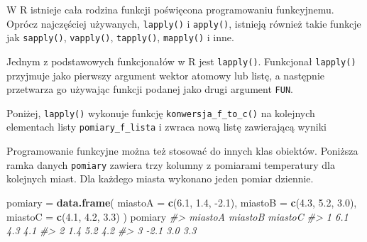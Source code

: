 \documentclass[paper=6in:9in,pagesize=pdftex,headinclude=on,footinclude=on,10pt]{scrbook}
\makeatletter
\newenvironment{Shaded}{\begin{snugshade}}{\end{snugshade}}
\newcommand{\CommentTok}[1]{\textcolor[rgb]{0.56,0.35,0.01}{\textit{#1}}}
\newcommand{\DataTypeTok}[1]{\textcolor[rgb]{0.13,0.29,0.53}{#1}}
\newcommand{\FloatTok}[1]{\textcolor[rgb]{0.00,0.00,0.81}{#1}}
\newcommand{\KeywordTok}[1]{\textcolor[rgb]{0.13,0.29,0.53}{\textbf{#1}}}
\newcommand{\NormalTok}[1]{#1}
\newcommand{\StringTok}[1]{\textcolor[rgb]{0.31,0.60,0.02}{#1}}
\newenvironment{kframe}{%
\medskip{}
\setlength{\fboxsep}{.8em}
 \def\at@end@of@kframe{}%
 \ifinner\ifhmode%
  \def\at@end@of@kframe{\end{minipage}}%
  \begin{minipage}{\columnwidth}%
 \fi\fi%
 \def\FrameCommand##1{\hskip\@totalleftmargin \hskip-\fboxsep
 \colorbox{shadecolor}{##1}\hskip-\fboxsep
     \hskip-\linewidth \hskip-\@totalleftmargin \hskip\columnwidth}%
 \MakeFramed {\advance\hsize-\width
   \@totalleftmargin\z@ \linewidth\hsize
   \@setminipage}}%
 {\par\unskip\endMakeFramed%
 \at@end@of@kframe}
\newenvironment{rmdblock}[1]
  {
  \begin{itemize}
  \renewcommand{\labelitemi}{
    \raisebox{-.7\height}[0pt][0pt]{
      {\setkeys{Gin}{width=3em,keepaspectratio}\texttt{[image: images/\#1]}}
    }
  }
  \setlength{\fboxsep}{1em}
  \begin{kframe}
  \item
  }
  {
  \end{kframe}
  \end{itemize}
  }
\newenvironment{rmdinfo}
  {\begin{rmdblock}{compass}}
  {\end{rmdblock}}
\makeatother
\begin{document}
\begin{rmdinfo}
W R istnieje cała rodzina funkcji poświęcona programowaniu funkcyjnemu.
Oprócz najczęściej używanych, \texttt{lapply()} i \texttt{apply()}, istnieją również takie funkcje jak \texttt{sapply()}, \texttt{vapply()}, \texttt{tapply()}, \texttt{mapply()} i inne.
\end{rmdinfo}

Jednym z podstawowych funkcjonałów w R jest \texttt{lapply()}.
Funkcjonał \texttt{lapply()} przyjmuje jako pierwszy argument wektor atomowy lub listę, a następnie przetwarza go używając funkcji podanej jako drugi argument \texttt{FUN}.

Poniżej, \texttt{lapply()} wykonuje funkcję \texttt{konwersja\_f\_to\_c()} na kolejnych elementach listy \texttt{pomiary\_f\_lista} i zwraca nową listę zawierającą wyniki

\begin{Shaded}
\end{Shaded}

Programowanie funkcyjne można też stosować do innych klas obiektów.
Poniższa ramka danych \texttt{pomiary} zawiera trzy kolumny z pomiarami temperatury dla kolejnych miast.
Dla każdego miasta wykonano jeden pomiar dziennie.

\begin{Shaded}
\begin{Highlighting}[]
\NormalTok{pomiary =}\StringTok{ }\KeywordTok{data.frame}\NormalTok{(}
  \DataTypeTok{miastoA =} \KeywordTok{c}\NormalTok{(}\FloatTok{6.1}\NormalTok{, }\FloatTok{1.4}\NormalTok{, }\FloatTok{-2.1}\NormalTok{),}
  \DataTypeTok{miastoB =} \KeywordTok{c}\NormalTok{(}\FloatTok{4.3}\NormalTok{, }\FloatTok{5.2}\NormalTok{, }\FloatTok{3.0}\NormalTok{),}
  \DataTypeTok{miastoC =} \KeywordTok{c}\NormalTok{(}\FloatTok{4.1}\NormalTok{, }\FloatTok{4.2}\NormalTok{, }\FloatTok{3.3}\NormalTok{)}
\NormalTok{)}
\NormalTok{pomiary}
\CommentTok{#>   miastoA miastoB miastoC}
\CommentTok{#> 1     6.1     4.3     4.1}
\CommentTok{#> 2     1.4     5.2     4.2}
\CommentTok{#> 3    -2.1     3.0     3.3}
\end{Highlighting}
\end{Shaded}
\end{document}
